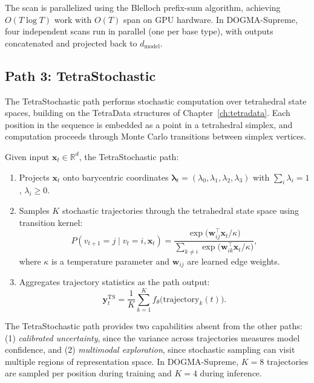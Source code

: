 The scan is parallelized using the Blelloch prefix-sum algorithm, achieving $O(T \log T)$ work with $O(T)$ span on GPU hardware. In DOGMA-Supreme, four independent scans run in parallel (one per base type), with outputs concatenated and projected back to $d_{\text{model}}$.

\subsection{Path 3: TetraStochastic}
\label{sec:tetrastochastic-path}

The TetraStochastic path performs stochastic computation over tetrahedral state spaces, building on the TetraData structures of Chapter~\ref{ch:tetradata}. Each position in the sequence is embedded as a point in a tetrahedral simplex, and computation proceeds through Monte Carlo transitions between simplex vertices.

\begin{dogmadef}
Given input $\mathbf{x}_t \in \mathbb{R}^d$, the TetraStochastic path:
\begin{enumerate}[leftmargin=1.5em]
  \item Projects $\mathbf{x}_t$ onto barycentric coordinates $\boldsymbol{\lambda}_t = (\lambda_0, \lambda_1, \lambda_2, \lambda_3)$ with $\sum_i \lambda_i = 1$, $\lambda_i \geq 0$.
  \item Samples $K$ stochastic trajectories through the tetrahedral state space using transition kernel:
  \begin{equation}
    P(v_{t+1} = j \mid v_t = i, \mathbf{x}_t) = \frac{\exp\bigl(\mathbf{w}_{ij}^\top \mathbf{x}_t / \kappa\bigr)}{\sum_{k \neq i} \exp\bigl(\mathbf{w}_{ik}^\top \mathbf{x}_t / \kappa\bigr)},
    \label{eq:tetra-transition}
  \end{equation}
  where $\kappa$ is a temperature parameter and $\mathbf{w}_{ij}$ are learned edge weights.
  \item Aggregates trajectory statistics as the path output:
  \begin{equation}
    \mathbf{y}_t^{\mathrm{TS}} = \frac{1}{K} \sum_{k=1}^{K} f_{\theta}\bigl(\text{trajectory}_k(t)\bigr).
    \label{eq:tetra-aggregate}
  \end{equation}
\end{enumerate}
\end{dogmadef}

The TetraStochastic path provides two capabilities absent from the other paths: (1) \emph{calibrated uncertainty}, since the variance across trajectories measures model confidence, and (2) \emph{multimodal exploration}, since stochastic sampling can visit multiple regions of representation space. In DOGMA-Supreme, $K = 8$ trajectories are sampled per position during training and $K = 4$ during inference.

